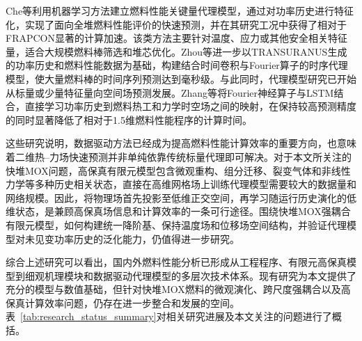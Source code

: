 Che等\cite{cheMachineLearningAssistedSurrogate2022}利用机器学习方法建立燃料性能关键量代理模型，通过对功率历史进行特征化，实现了面向全堆燃料性能评价的快速预测，并在其研究工况中获得了相对于FRAPCON显著的计算加速。该类方法主要针对温度、应力或其他安全相关特征量，适合大规模燃料棒筛选和堆芯优化。Zhou等\cite{zhouDeepHeterogeneousJoint2025}进一步以TRANSURANUS生成的功率历史和燃料性能数据为基础，构建结合时间卷积与Fourier算子的时序代理模型，使大量燃料棒的时间序列预测达到毫秒级。与此同时，代理模型研究已开始从标量或少量特征量向空间场预测发展。Zhang等\cite{zhangLearningSimulateQuasiSteady2025}将Fourier神经算子与LSTM结合，直接学习功率历史到燃料热工和力学时空场之间的映射，在保持较高预测精度的同时显著降低了相对于1.5维燃料性能程序的计算时间。

这些研究说明，数据驱动方法已经成为提高燃料性能计算效率的重要方向，也意味着二维热--力场快速预测并非单纯依靠传统标量代理即可解决。对于本文所关注的快堆MOX问题，高保真有限元模型包含微观重构、组分迁移、裂变气体和非线性力学等多种历史相关状态，直接在高维网格场上训练代理模型需要较大的数据量和网络规模。因此，将物理场首先投影至低维正交空间，再学习随运行历史演化的低维状态，是兼顾高保真场信息和计算效率的一条可行途径。围绕快堆MOX强耦合有限元模型，如何构建统一降阶基、保持温度场和位移场空间结构，并验证代理模型对未见变功率历史的泛化能力，仍值得进一步研究。


综合上述研究可以看出，国内外燃料性能分析已形成从工程程序、有限元高保真模型到细观机理模块和数据驱动代理模型的多层次技术体系。现有研究为本文提供了充分的模型与数值基础，但针对快堆MOX燃料的微观演化、跨尺度强耦合以及高保真计算效率问题，仍存在进一步整合和发展的空间。表~\ref{tab:research_status_summary}对相关研究进展及本文关注的问题进行了概括。

